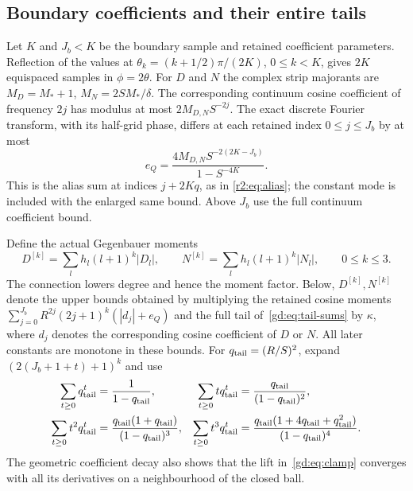\subsection{Boundary coefficients and their entire tails}\label{gd:sec:boundary}
Let $K$ and $J_b<K$ be the boundary sample and retained coefficient
parameters. Reflection of the values at
$\theta_k=(k+1/2)\pi/(2K)$, $0\le k<K$, gives $2K$
equispaced samples in $\phi=2\theta$.
For $D$ and $N$ the complex strip majorants are
$M_D=M_*+1$, $M_N=2SM_*/\delta$.
The corresponding continuum cosine coefficient of frequency $2j$
has modulus at most $2M_{D,N}S^{-2j}$.
The exact discrete Fourier transform, with its half-grid phase,
differs at each retained index $0\le j\le J_b$ by at most
\begin{equation}\label{gd:eq:alias}
 e_Q=\frac{4M_{D,N}S^{-2(2K-J_b)}}{1-S^{-4K}} .
\end{equation}
This is the alias sum at indices $j+2Kq$, as in
\eqref{r2:eq:alias}; the constant mode is included with the enlarged
same bound. Above $J_b$ use the full continuum coefficient bound.

Define the actual Gegenbauer moments
\begin{equation}\label{gd:eq:boundary-moments}
 D^{[k]}=\sum_lh_l(l+1)^k|D_l|,\qquad
 N^{[k]}=\sum_lh_l(l+1)^k|N_l|,\qquad 0\le k\le3.
\end{equation}
The connection lowers degree and hence the moment factor. Below,
$D^{[k]},N^{[k]}$ denote the upper bounds obtained by multiplying
the retained cosine moments
$\sum_{j=0}^{J_b}R^{2j}(2j+1)^k(|d_j|+e_Q)$ and the full tail
of~\eqref{gd:eq:tail-sums} by $\kappa$, where $d_j$ denotes the
corresponding cosine coefficient of $D$ or $N$. All later constants
are monotone in these bounds. For $q_{\rm tail}=(R/S)^2$, expand
$(2(J_b+1+t)+1)^k$ and use
\begin{equation}\label{gd:eq:tail-sums}
 \begin{aligned}
 \sum_{t\ge0}q_{\rm tail}^t&=\frac1{1-q_{\rm tail}},&
 \sum_{t\ge0}tq_{\rm tail}^t&=\frac{q_{\rm tail}}{(1-q_{\rm tail})^2},\\
 \sum_{t\ge0}t^2q_{\rm tail}^t&=\frac{q_{\rm tail}(1+q_{\rm tail})}{(1-q_{\rm tail})^3},&
 \sum_{t\ge0}t^3q_{\rm tail}^t&=\frac{q_{\rm tail}(1+4q_{\rm tail}+q_{\rm tail}^2)}{(1-q_{\rm tail})^4}.
 \end{aligned}
\end{equation}
The geometric coefficient decay also shows
that the lift in~\eqref{gd:eq:clamp} converges with all its derivatives
on a neighbourhood of the closed ball.

